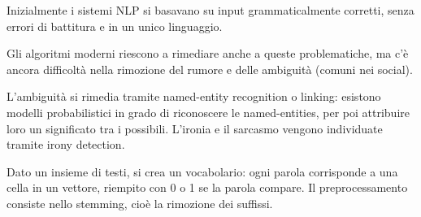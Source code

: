 Inizialmente i sistemi NLP si basavano su input grammaticalmente corretti, senza errori di battitura e in un unico linguaggio.

Gli algoritmi moderni riescono a rimediare anche a queste problematiche, ma c'è ancora difficoltà nella rimozione del rumore e delle ambiguità (comuni nei social). 

L'ambiguità si rimedia tramite named-entity recognition o linking: esistono modelli probabilistici in grado di riconoscere le named-entities, per poi attribuire loro un significato tra i possibili. L'ironia e il sarcasmo vengono individuate tramite irony detection. 

Dato un insieme di testi, si crea un vocabolario: ogni parola corrisponde a una cella in un vettore, riempito con 0 o 1 se la parola compare. Il preprocessamento consiste nello stemming, cioè la rimozione dei suffissi.